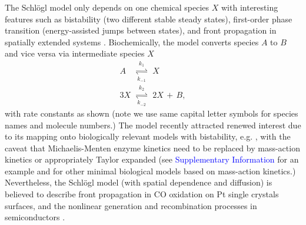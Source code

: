 \documentclass[aps,prl,reprint,singlecolumn,superscriptaddress]{revtex4}
\begin{document}
The Schl\"ogl model only depends on one chemical species $X$ with interesting features such as bistability (two different stable 
steady states), first-order phase transition (energy-assisted jumps between states), and front propagation in spatially 
extended systems \cite{vellela09,endres15}. Biochemically, the model converts species $A$ to $B$ and vice versa via intermediate species $X$ 
\begin{subequations}
\begin{eqnarray}
A &\underset{k_{-1}}{\stackrel{k_1}{\rightleftharpoons}}& X \label{A}\\
3X &\underset{k_{-2}}{\stackrel{k_2}{\rightleftharpoons}}& 2X\,+\,B,\label{B}
\end{eqnarray}
\end{subequations}
with rate constants as shown (note we use same capital letter symbols for species names and molecule numbers.)
The model recently attracted renewed interest due to its mapping onto biologically relevant models with bistability, e.g. \cite{scheffer01,ozbudak04,endres15}, 
with the caveat that Michaelis-Menten enzyme kinetics need to be replaced by mass-action kinetics \cite{endres15} or appropriately Taylor expanded 
(see \textcolor{blue}{Supplementary Information} for an example and \cite{wilhelm09} for other minimal biological models based on 
mass-action kinetics.) Nevertheless, the Schl\"ogl model (with spatial dependence and diffusion) is believed to describe front propagation in 
CO oxidation on Pt single crystals surfaces, and the nonlinear generation and recombination processes in semiconductors \cite{ertl15}.
\end{document}
